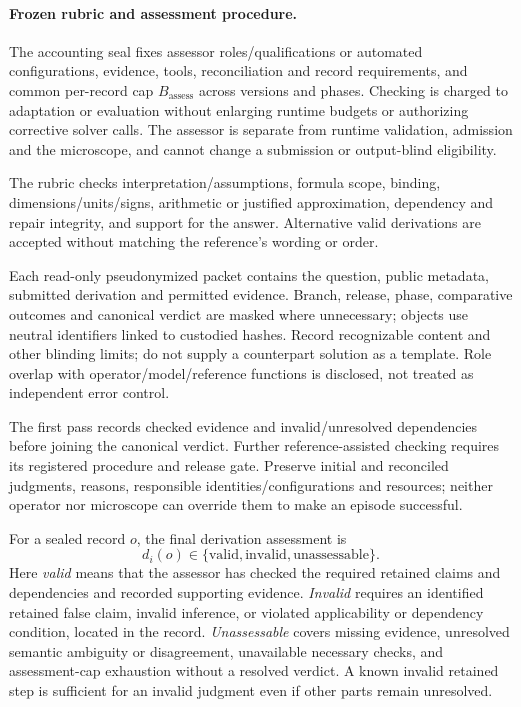 \documentclass[10pt]{article} %
\providecommand{\1}{\mathbf{1}}  %
\theoremstyle{remark}
\theoremstyle{definition}
\begin{document}
\paragraph{Frozen rubric and assessment procedure.}

The accounting seal fixes assessor roles/qualifications or automated
configurations, evidence, tools, reconciliation and record requirements,
and common per-record cap $B_{\mathrm{assess}}$ across versions and phases.
Checking is charged to adaptation or evaluation without enlarging runtime
budgets or authorizing corrective solver calls. The assessor is separate
from runtime validation, admission and the microscope, and cannot change
a submission or output-blind eligibility.

The rubric checks interpretation/assumptions, formula scope, binding,
dimensions/units/signs, arithmetic or justified approximation, dependency and
repair integrity, and support for the answer. Alternative valid derivations
are accepted without matching the reference's wording or order.

Each read-only pseudonymized packet contains the question, public metadata,
submitted derivation and permitted evidence. Branch, release, phase,
comparative outcomes and canonical verdict are masked where unnecessary;
objects use neutral identifiers linked to custodied hashes. Record recognizable
content and other blinding limits; do not supply a counterpart solution as
a template. Role overlap with operator/model/reference functions is disclosed,
not treated as independent error control.

The first pass records checked evidence and invalid/unresolved dependencies
before joining the canonical verdict. Further reference-assisted checking
requires its registered procedure and release gate. Preserve initial and
reconciled judgments, reasons, responsible identities/configurations and
resources; neither operator nor microscope can override them to make an
episode successful.

For a sealed record $o$, the final derivation assessment is
\begin{equation}
d_i(o)\in
\{\mathrm{valid},\mathrm{invalid},\mathrm{unassessable}\}.
\label{eq:pilot-derivation-assessment}
\end{equation}
Here \emph{valid} means that the assessor has checked the required
retained claims and dependencies and recorded supporting evidence.
\emph{Invalid} requires an identified retained false claim, invalid
inference, or violated applicability or dependency condition, located
in the record. \emph{Unassessable} covers missing evidence, unresolved
semantic ambiguity or disagreement, unavailable necessary checks, and
assessment-cap exhaustion without a resolved verdict. A known invalid
retained step is sufficient for an invalid judgment even if other
parts remain unresolved.
\end{document}
